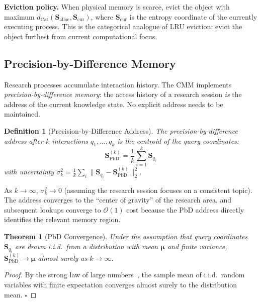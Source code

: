 \documentclass[12pt,twocolumn]{article}
\newtheorem{theorem}{Theorem}[section]
\newtheorem{definition}{Definition}[section]
\DeclareMathOperator{\Cat}{Cat}
\begin{document}
\textbf{Eviction policy.} When physical memory is scarce, evict the object with maximum $d_{\Cat}(\mathbf{S}_{\text{alloc}}, \mathbf{S}_{\text{cur}})$, where $\mathbf{S}_{\text{cur}}$ is the entropy coordinate of the currently executing process. This is the categorical analogue of LRU eviction: evict the object furthest from current computational focus.

\subsection{Precision-by-Difference Memory}

Research processes accumulate interaction history. The CMM implements \emph{precision-by-difference memory}: the access history of a research session \emph{is} the address of the current knowledge state. No explicit address needs to be maintained.

\begin{definition}[Precision-by-Difference Address]
The precision-by-difference address after $k$ interactions $q_1, \ldots, q_k$ is the centroid of the query coordinates:
\begin{equation}
\mathbf{S}_{\text{PbD}}^{(k)} = \frac{1}{k} \sum_{i=1}^k \mathbf{S}_{q_i}
\end{equation}
with uncertainty $\sigma_k^2 = \frac{1}{k} \sum_i \|\mathbf{S}_{q_i} - \mathbf{S}_{\text{PbD}}^{(k)}\|_2^2$.
\end{definition}

As $k \to \infty$, $\sigma_k^2 \to 0$ (assuming the research session focuses on a consistent topic). The address converges to the ``center of gravity'' of the research area, and subsequent lookups converge to $\mathcal{O}(1)$ cost because the PbD address directly identifies the relevant memory region.

\begin{theorem}[PbD Convergence]
Under the assumption that query coordinates $\mathbf{S}_{q_i}$ are drawn i.i.d.\ from a distribution with mean $\boldsymbol{\mu}$ and finite variance, $\mathbf{S}_{\text{PbD}}^{(k)} \to \boldsymbol{\mu}$ almost surely as $k \to \infty$.
\end{theorem}

\begin{proof}
By the strong law of large numbers~\cite{cover2006elements}, the sample mean of i.i.d.\ random variables with finite expectation converges almost surely to the distribution mean. $\square$
\end{proof}
\end{document}

